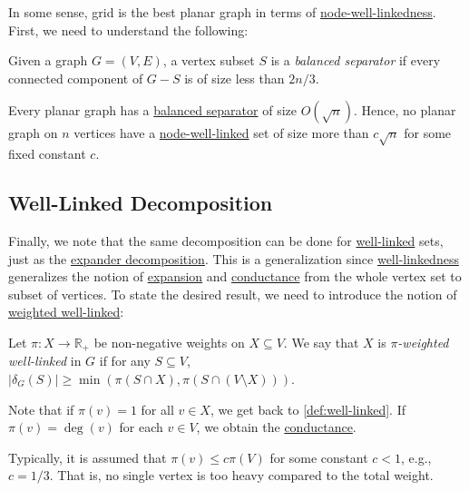 In some sense, grid is the best planar graph in terms of \hyperref[def:node-well-linked]{node-well-linkedness}. First, we need to understand the following:

\begin{definition}\label{def:balanced-separator}
	Given a graph \(G = (V, E)\), a vertex subset \(S\) is a \emph{balanced separator} if every connected component of \(G-S\) is of size less than \(2n / 3\).
\end{definition}

\begin{theorem}
	Every planar graph has a \hyperref[def:balanced-separator]{balanced separator} of size \(O(\sqrt{n} )\). Hence, no planar graph on \(n\) vertices have a \hyperref[def:node-well-linked]{node-well-linked} set of size more than \(c \sqrt{n} \) for some fixed constant \(c\).
\end{theorem}

\subsection{Well-Linked Decomposition}
Finally, we note that the same decomposition can be done for \hyperref[def:well-linked]{well-linked} sets, just as the \hyperref[def:expander-decomposition]{expander decomposition}. This is a generalization since \hyperref[def:well-linked]{well-linkedness} generalizes the notion of \hyperref[def:expansion]{expansion} and \hyperref[def:conductance]{conductance} from the whole vertex set to subset of vertices. To state the desired result, we need to introduce the notion of \hyperref[def:weighted-well-linked]{weighted well-linked}:

\begin{definition}\label{def:weighted-well-linked}
	Let \(\pi \colon X \to \mathbb{R} _{+}\) be non-negative weights on \(X \subseteq V\). We say that \(X\) is \emph{\(\pi \)-weighted well-linked} in \(G\) if for any \(S \subseteq V\), \(\lvert \delta _G(S) \rvert \geq \min (\pi (S \cap X), \pi (S \cap (V\setminus X)))\).
\end{definition}

Note that if \(\pi (v) = 1\) for all \(v \in X\), we get back to \autoref{def:well-linked}. If \(\pi (v) = \deg(v)\) for each \(v \in V\), we obtain the \hyperref[def:conductance]{conductance}.

\begin{remark}
	Typically, it is assumed that \(\pi (v) \leq c \pi (V)\) for some constant \(c < 1\), e.g., \(c = 1 / 3\). That is, no single vertex is too heavy compared to the total weight.
\end{remark}

